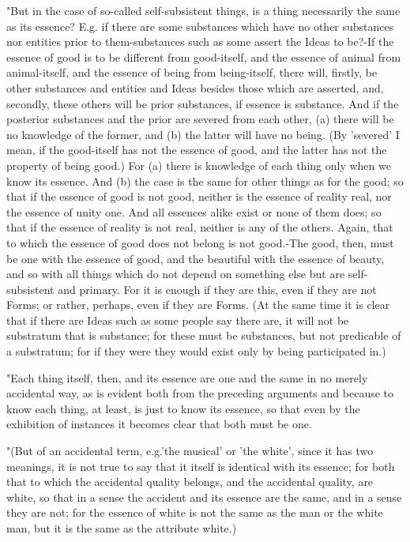 "But in the case of so-called self-subsistent things, is a thing necessarily
the same as its essence? E.g. if there are some substances which have
no other substances nor entities prior to them-substances such as
some assert the Ideas to be?-If the essence of good is to be different
from good-itself, and the essence of animal from animal-itself, and
the essence of being from being-itself, there will, firstly, be other
substances and entities and Ideas besides those which are asserted,
and, secondly, these others will be prior substances, if essence is
substance. And if the posterior substances and the prior are severed
from each other, (a) there will be no knowledge of the former, and
(b) the latter will have no being. (By 'severed' I mean, if the good-itself
has not the essence of good, and the latter has not the property of
being good.) For (a) there is knowledge of each thing only when we
know its essence. And (b) the case is the same for other things as
for the good; so that if the essence of good is not good, neither
is the essence of reality real, nor the essence of unity one. And
all essences alike exist or none of them does; so that if the essence
of reality is not real, neither is any of the others. Again, that
to which the essence of good does not belong is not good.-The good,
then, must be one with the essence of good, and the beautiful with
the essence of beauty, and so with all things which do not depend
on something else but are self-subsistent and primary. For it is enough
if they are this, even if they are not Forms; or rather, perhaps,
even if they are Forms. (At the same time it is clear that if there
are Ideas such as some people say there are, it will not be substratum
that is substance; for these must be substances, but not predicable
of a substratum; for if they were they would exist only by being participated
in.) 

"Each thing itself, then, and its essence are one and the same in
no merely accidental way, as is evident both from the preceding arguments
and because to know each thing, at least, is just to know its essence,
so that even by the exhibition of instances it becomes clear that
both must be one. 

"(But of an accidental term, e.g.'the musical' or 'the white', since
it has two meanings, it is not true to say that it itself is identical
with its essence; for both that to which the accidental quality belongs,
and the accidental quality, are white, so that in a sense the accident
and its essence are the same, and in a sense they are not; for the
essence of white is not the same as the man or the white man, but
it is the same as the attribute white.) 

